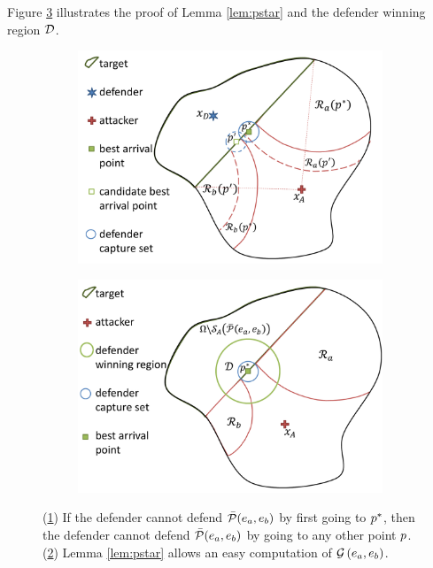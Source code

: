 Figure \ref{fig:lemma2} illustrates the proof of Lemma \ref{lem:pstar} and the defender winning region $\mathcal{D}$.
\begin{figure}
\centering
	\centering
	\begin{subfigure}{0.3\textwidth}
	\includegraphics[width=\textwidth]{"fig/best point pstar"}
	\caption{\label{subfig:pstar}}
	\end{subfigure}
	\begin{subfigure}{0.3\textwidth}
	\centering
	\includegraphics[width=\textwidth]{"fig/defender winning pd"}
	\caption{\label{subfig:dregion}}
	\end{subfigure}
	\caption{(\ref{subfig:pstar}) If the defender cannot defend $\bar{\mathcal{P}}(e_a,e_b)$ by first going to $p^*$, then the defender cannot defend $\bar{\mathcal{P}}(e_a,e_b)$ by going to any other point $p$. (\ref{subfig:dregion}) Lemma \ref{lem:pstar} allows an easy computation of $\mathcal{G}\left(e_a,e_b\right)$.}
	\label{fig:lemma2}
\end{figure}


